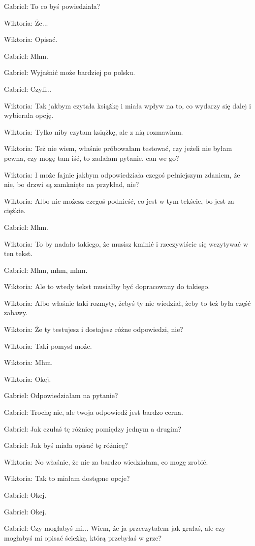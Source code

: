 Gabriel: To co byś powiedziała?

Wiktoria: Że...

Wiktoria: Opisać.

Gabriel: Mhm.

Gabriel: Wyjaśnić może bardziej po polsku.

Gabriel: Czyli...

Wiktoria: Tak jakbym czytała książkę i miała wpływ na to, co wydarzy się dalej i wybierała opcję.

Wiktoria: Tylko niby czytam książkę, ale z nią rozmawiam.

Wiktoria: Też nie wiem, właśnie próbowałam testować, czy jeżeli nie byłam pewna, czy mogę tam iść, to zadałam pytanie, can we go?

Wiktoria: I może fajnie jakbym odpowiedziała czegoś pełniejszym zdaniem, że nie, bo drzwi są zamknięte na przykład, nie?

Wiktoria: Albo nie możesz czegoś podnieść, co jest w tym tekście, bo jest za ciężkie.

Gabriel: Mhm.

Wiktoria: To by nadało takiego, że musisz kminić i rzeczywiście się wczytywać w ten tekst.

Gabriel: Mhm, mhm, mhm.

Wiktoria: Ale to wtedy tekst musiałby być dopracowany do takiego.

Wiktoria: Albo właśnie taki rozmyty, żebyś ty nie wiedział, żeby to też była część zabawy.

Wiktoria: Że ty testujesz i dostajesz różne odpowiedzi, nie?

Wiktoria: Taki pomysł może.

Wiktoria: Mhm.

Wiktoria: Okej.

Gabriel: Odpowiedziałam na pytanie?

Gabriel: Trochę nie, ale twoja odpowiedź jest bardzo cerna.

Gabriel: Jak czułaś tę różnicę pomiędzy jednym a drugim?

Gabriel: Jak byś miała opisać tę różnicę?

Wiktoria: No właśnie, że nie za bardzo wiedziałam, co mogę zrobić.

Wiktoria: Tak to miałam dostępne opcje?

Gabriel: Okej.

Gabriel: Okej.

Gabriel: Czy mogłabyś mi... Wiem, że ja przeczytałem jak grałaś, ale czy mogłabyś mi opisać ścieżkę, którą przebyłaś w grze?

